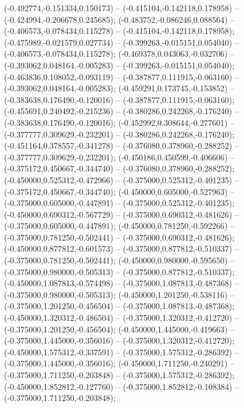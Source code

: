  (-0.492774,-0.151334,0.150173) -- (-0.415104,-0.142118,0.178958) -- (-0.424994,-0.206678,0.245685);
 (-0.483752,-0.086246,0.088564) -- (-0.406573,-0.078434,0.115278) -- (-0.415104,-0.142118,0.178958);
 (-0.475989,-0.021579,0.027734) -- (-0.399263,-0.015151,0.054040) -- (-0.406573,-0.078434,0.115278);
 (-0.469378,0.043063,-0.032706) -- (-0.393062,0.048164,-0.005283) -- (-0.399263,-0.015151,0.054040);
 (-0.463836,0.108052,-0.093119) -- (-0.387877,0.111915,-0.063160) -- (-0.393062,0.048164,-0.005283);
 (-0.459291,0.173745,-0.153852) -- (-0.383638,0.176490,-0.120016) -- (-0.387877,0.111915,-0.063160);
 (-0.455691,0.240492,-0.215236) -- (-0.380286,0.242268,-0.176240) -- (-0.383638,0.176490,-0.120016);
 (-0.452992,0.308644,-0.277601) -- (-0.377777,0.309629,-0.232201) -- (-0.380286,0.242268,-0.176240);
 (-0.451164,0.378557,-0.341278) -- (-0.376080,0.378960,-0.288252) -- (-0.377777,0.309629,-0.232201);
 (-0.450186,0.450599,-0.406606) -- (-0.375172,0.450667,-0.344740) -- (-0.376080,0.378960,-0.288252);
 (-0.450000,0.525312,-0.472966) -- (-0.375000,0.525312,-0.401235) -- (-0.375172,0.450667,-0.344740);
 (-0.450000,0.605000,-0.527963) -- (-0.375000,0.605000,-0.447891) -- (-0.375000,0.525312,-0.401235);
 (-0.450000,0.690312,-0.567729) -- (-0.375000,0.690312,-0.481626) -- (-0.375000,0.605000,-0.447891);
 (-0.450000,0.781250,-0.592266) -- (-0.375000,0.781250,-0.502441) -- (-0.375000,0.690312,-0.481626);
 (-0.450000,0.877812,-0.601573) -- (-0.375000,0.877812,-0.510337) -- (-0.375000,0.781250,-0.502441);
 (-0.450000,0.980000,-0.595650) -- (-0.375000,0.980000,-0.505313) -- (-0.375000,0.877812,-0.510337);
 (-0.450000,1.087813,-0.574498) -- (-0.375000,1.087813,-0.487368) -- (-0.375000,0.980000,-0.505313);
 (-0.450000,1.201250,-0.538116) -- (-0.375000,1.201250,-0.456504) -- (-0.375000,1.087813,-0.487368);
 (-0.450000,1.320312,-0.486504) -- (-0.375000,1.320312,-0.412720) -- (-0.375000,1.201250,-0.456504);
 (-0.450000,1.445000,-0.419663) -- (-0.375000,1.445000,-0.356016) -- (-0.375000,1.320312,-0.412720);
 (-0.450000,1.575312,-0.337591) -- (-0.375000,1.575312,-0.286392) -- (-0.375000,1.445000,-0.356016);
 (-0.450000,1.711250,-0.240291) -- (-0.375000,1.711250,-0.203848) -- (-0.375000,1.575312,-0.286392);
 (-0.450000,1.852812,-0.127760) -- (-0.375000,1.852812,-0.108384) -- (-0.375000,1.711250,-0.203848);
